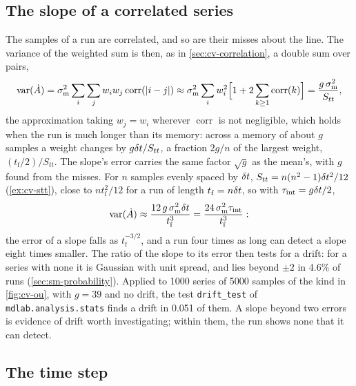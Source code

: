 \subsection*{The slope of a correlated series}

The samples of a run are correlated, and so are their misses about the
line. The variance of the weighted sum is then, as in
\cref{sec:cv-correlation}, a double sum over pairs,
\begin{equation*}
   \operatorname{var}(\dot A) = \sigma_{\mathrm m}^2\sum_i\sum_jw_iw_j
   \operatorname{corr}(\lvert i - j\rvert)
   \approx \sigma_{\mathrm m}^2\sum_iw_i^2\Bigl[1 +
   2\sum_{k\ge1}\operatorname{corr}(k)\Bigr]
   = \frac{g\,\sigma_{\mathrm m}^2}{S_{tt}} ,
\end{equation*}
the approximation taking $w_j = w_i$ wherever $\operatorname{corr}$ is not
negligible, which holds when the run is much longer than its memory: across
a memory of about $g$ samples a weight changes by $g\delta t/S_{tt}$, a fraction
$2g/n$ of the largest weight, $(t_{\mathrm f}/2)/S_{tt}$. The slope's
error carries the same factor $\sqrt g$ as the mean's, with $g$ found from
the misses. For $n$ samples evenly spaced by $\delta t$, $S_{tt} = n(n^2 -
1)\delta t^2/12$ (\cref{ex:cv-stt}), close to $nt_{\mathrm f}^2/12$ for a run
of length $t_{\mathrm f} = n\delta t$, so with $\tau_{\mathrm{int}} = g\delta t/2$,
\begin{equation*}
   \operatorname{var}(\dot A) \approx
   \frac{12\,g\,\sigma_{\mathrm m}^2\delta t}{t_{\mathrm f}^3}
   = \frac{24\,\sigma_{\mathrm m}^2\tau_{\mathrm{int}}}{t_{\mathrm f}^3} :
\end{equation*}
the error of a slope falls as $t_{\mathrm f}^{-3/2}$, and a run four times
as long can detect a slope eight times smaller. The ratio of the slope to
its error then tests for a drift: for a series with none it is Gaussian
with unit spread, and lies beyond $\pm2$ in 4.6\% of runs
(\cref{sec:sm-probability}). Applied to 1000 series of 5000 samples of the
kind in \cref{fig:cv-ou}, with $g = 39$ and no drift, the
test \texttt{drift\_test} of \texttt{mdlab.analysis.stats} finds a drift
in 0.051 of them. A slope beyond two errors is evidence of drift worth investigating; within them, the run shows none that it can detect.

\subsection*{The time step}

